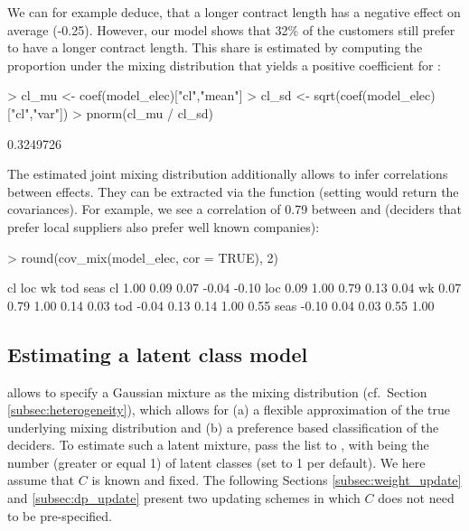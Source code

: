 \documentclass[article]{jss}
\newcommand{\fct}[1]{\code{#1()}}
\begin{document}
We can for example deduce, that a longer contract length has a negative effect on average (-0.25). However, our model shows that 32\% of the customers still prefer to have a longer contract length. This share is estimated by computing the proportion under the mixing distribution that yields a positive coefficient for :

\begin{Schunk}
\begin{Sinput}
> cl_mu <- coef(model_elec)["cl","mean"]
> cl_sd <- sqrt(coef(model_elec)["cl","var"])
> pnorm(cl_mu / cl_sd)
\end{Sinput}
\begin{Soutput}
[1] 0.3249726
\end{Soutput}
\end{Schunk}

The estimated joint mixing distribution additionally allows to infer correlations between effects. They can be extracted via the \fct{cov\_mix} function (setting  would return the covariances). For example, we see a correlation of 0.79 between  and  (deciders that prefer local suppliers also prefer well known companies):

\begin{Schunk}
\begin{Sinput}
> round(cov_mix(model_elec, cor = TRUE), 2)
\end{Sinput}
\begin{Soutput}
        cl  loc   wk   tod  seas
cl    1.00 0.09 0.07 -0.04 -0.10
loc   0.09 1.00 0.79  0.13  0.04
wk    0.07 0.79 1.00  0.14  0.03
tod  -0.04 0.13 0.14  1.00  0.55
seas -0.10 0.04 0.03  0.55  1.00
\end{Soutput}
\end{Schunk}

\subsection{Estimating a latent class model} \label{subsec:latent_classes}

 allows to specify a Gaussian mixture as the mixing distribution (cf.\ Section \ref{subsec:heterogeneity}), which allows for (a) a flexible approximation of the true underlying mixing distribution and (b) a preference based classification of the deciders. To estimate such a latent mixture, pass the list  to \fct{fit\_model}, with  being the number (greater or equal 1) of latent classes (set to 1 per default). We here assume that $C$ is known and fixed. The following Sections \ref{subsec:weight_update} and \ref{subsec:dp_update} present two updating schemes in which $C$ does not need to be pre-specified.
\end{document}
